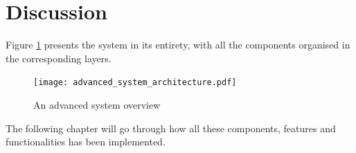 \section{Discussion}

Figure \ref{fig:advanced_system} presents the system in its entirety,
with all the components organised in the corresponding layers.


\begin{figure}[H]
\centering
\texttt{[image: advanced\_system\_architecture.pdf]}

\caption{An advanced system overview}
\label{fig:advanced_system}
\end{figure}

The following chapter will go through how all these components,
features and functionalities has been implemented.

